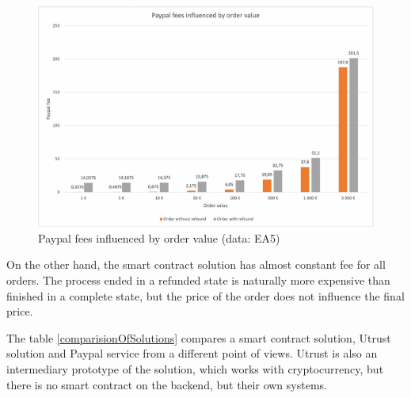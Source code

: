 \documentclass[thesis=M,english]{FITthesis}[2019/12/23]
\begin{document}
\begin{figure}[ht!]
    \centering
    \includegraphics[width=\textwidth]{assets/PaypalFees.pdf}
    \caption{Paypal fees influenced by order value  (data: EA5)}
    \label{fig:PaypalFees}
\end{figure}




On the other hand, the smart contract solution has almost constant fee for all orders. The process ended in a refunded state is naturally more expensive than finished in a complete state, but the price of the order does not influence the final price. 

The table \ref{comparisionOfSolutions} compares a smart contract solution, Utrust solution and Paypal service from a different point of views. Utrust is also an intermediary prototype of the solution, which works with cryptocurrency, but there is no smart contract on the backend, but their own systems. \cite{utrust}
\end{document}

